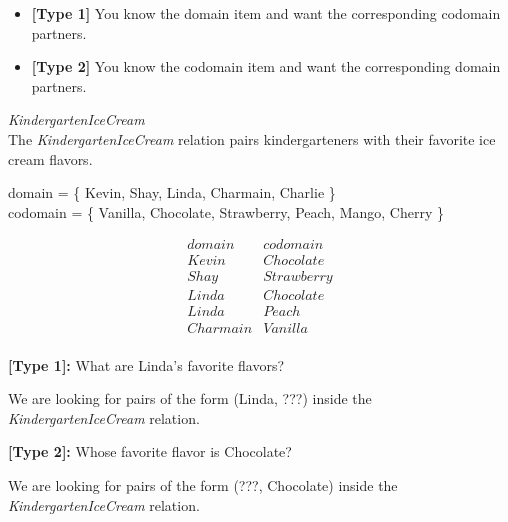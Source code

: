 \documentclass{ximera}
\begin{document}
\begin{itemize}
\item \textbf{[Type 1]} You know the domain item and want the corresponding codomain partners.
\item \textbf{[Type 2]} You know the codomain item and want the corresponding domain partners.
\end{itemize}



\begin{example} \textit{KindergartenIceCream} \\
The \textit{KindergartenIceCream} relation pairs kindergarteners with their favorite ice cream flavors.

domain = \{ Kevin, Shay, Linda, Charmain, Charlie \}  \\
codomain = \{ Vanilla, Chocolate, Strawberry, Peach, Mango, Cherry \} 

\[
\begin{array}{l|l}
    domain      & codomain      \\ \hline
    Kevin   &  Chocolate \\
    Shay   & Strawberry \\
    Linda  &  Chocolate \\
    Linda  &  Peach \\
    Charmain &  Vanilla \\ 
\end{array}
\]


\begin{question}
\textbf{[Type 1]:} What are Linda's favorite flavors? 

\begin{selectAll}
\end{selectAll}
\end{question}

We are looking for pairs of the form (Linda, ???) inside the \textit{KindergartenIceCream} relation.


\begin{question}
\textbf{[Type 2]:} Whose favorite flavor is Chocolate? 

\begin{selectAll}

\end{selectAll}
\end{question}

We are looking for pairs of the form (???, Chocolate) inside the \textit{KindergartenIceCream} relation.



\end{example} 
\end{document}
